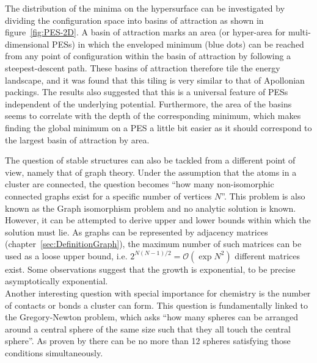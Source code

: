 %
The distribution of the minima on the hypersurface can be investigated by
dividing the configuration space into basins of attraction as shown in
figure~\ref{fig:PES-2D}. A basin of attraction marks an area (or hyper-area for
multi-dimensional \acp{PES}) in which the enveloped minimum (blue dots) can be
reached from any point of configuration within the basin of attraction by
following a steepest-descent path. These basins of attraction therefore tile the
energy landscape, and it was found that this tiling is very similar to that of
Apollonian packings.\autocite{Massen_Powerlawdistributionsareas_2007} The
results also suggested that this is a universal feature of \acp{PES} independent
of the underlying potential. Furthermore, the area of the basins seems to
correlate with the depth of the corresponding minimum, which makes finding the
global minimum on a \ac{PES} a little bit easier as it should correspond to the
largest basin of attraction by area.

The question of stable structures can also be tackled from a different point of
view, namely that of graph theory. Under the assumption that the atoms in a
cluster are connected, the question becomes ``how many non-isomorphic connected
graphs exist for a specific number of vertices $N$''. This problem is also known
as the Graph isomorphism problem and no analytic solution is known. However, it
can be attempted to derive upper and lower bounds within which the solution must
lie. As graphs can be represented by adjacency matrices
(chapter~\ref{sec:DefinitionGraph}), the maximum number of such matrices can be
used as a loose upper bound, i.e.
$2^{N(N-1)/2}=\mathcal{O}\left(\exp{N^2}\right)$ different matrices
exist.\autocite{Arkus_Minimalenergyclusters_2009} Some observations
suggest\autocite{Tsai_Useeigenmodemethod_1993} that the growth is exponential,
to be precise asymptotically
exponential.\autocite{Stillinger_Packingstructurestransitions_1984,Stillinger_Exponentialmultiplicityinherent_1999}
\\\newline
Another interesting question with special importance for chemistry is the number
of contacts or bonds a cluster can form. This question is fundamentally linked
to the Gregory-Newton problem, which asks ``how many spheres can be arranged
around a central sphere of the same size such that they all touch the central
sphere''. As proven by
\citeauthor{Schutte_ProblemdreizehnKugeln_1952}\autocite{Schutte_ProblemdreizehnKugeln_1952}
there can be no more than 12 spheres satisfying those conditions simultaneously.

